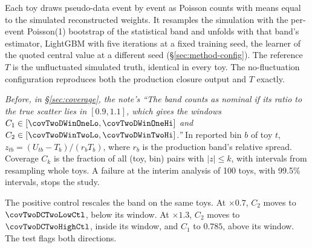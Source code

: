 Each toy draws pseudo-data event by event as Poisson counts with means equal to the simulated reconstructed weights. It resamples the simulation with the per-event Poisson(1) bootstrap of the statistical band and unfolds with that band's estimator, LightGBM with five iterations at a fixed training seed, the learner of the quoted central value at a different seed (\S\ref{sec:method-config}). The reference $T$ is the unfluctuated simulated truth, identical in every toy. The no-fluctuation configuration reproduces both the production closure output and $T$ exactly.

\emph{Before, in \S\ref{sec:coverage}, the note's ``The band counts as nominal if its ratio to the true scatter lies in $[0.9,1.1]$, which gives the windows $C_1\in[\covTwoDWinOneLo,\covTwoDWinOneHi]$ and $C_2\in[\covTwoDWinTwoLo,\covTwoDWinTwoHi]$.''}
In reported bin $b$ of toy $t$, $z_{tb}=(U_{tb}-T_b)/(r_b T_b)$, where $r_b$ is the production band's relative spread. Coverage $C_k$ is the fraction of all (toy, bin) pairs with $|z|\le k$, with intervals from resampling whole toys. A failure at the interim analysis of 100 toys, with 99.5\% intervals, stops the study.

The positive control rescales the band on the same toys. At $\times0.7$, $C_2$ moves to $\covTwoDCTwoLowCtl$, below its window. At $\times1.3$, $C_2$ moves to $\covTwoDCTwoHighCtl$, inside its window, and $C_1$ to $0.785$, above its window. The test flags both directions.

